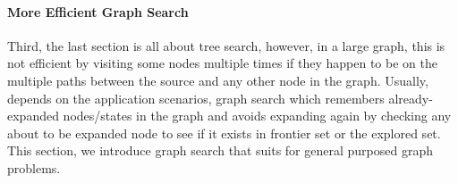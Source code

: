 \documentclass[main.tex]{subfiles}
\begin{document}
\paragraph{More Efficient Graph Search}
Third, the last section is all about tree search, however, in a large graph, this is not efficient by visiting some nodes multiple times if they happen to be on the multiple paths between the source and any other node in the graph. Usually, depends on the application scenarios, graph search which remembers already-expanded nodes/states in the graph and avoids expanding again by checking any about to be expanded node to see if it exists in frontier set or the explored set. This section, we introduce graph search that suits for general purposed graph problems. 

\end{document}
